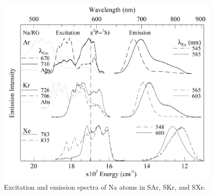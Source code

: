 \begin{figure} %
        \centering
                \includegraphics[width=.7\textwidth]{figures/Na_in_matrices.png}
                \caption{Excitation and emission spectra of Na atoms in SAr, SKr, and SXe.  \cite{matrixNa}}
\label{fig:matrixNa}
\end{figure}




